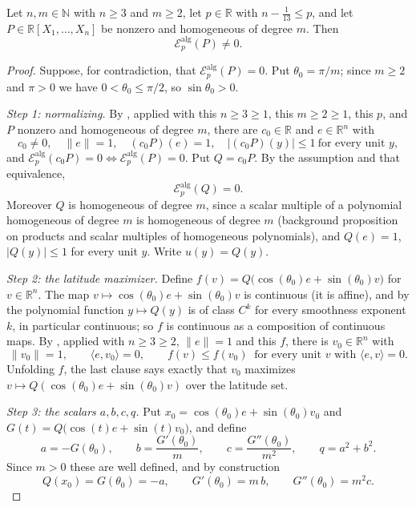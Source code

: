 \begin{theorem}
Let $n,m\in\mathbb{N}$ with $n\ge3$ and $m\ge2$, let $p\in\mathbb{R}$ with
$n-\tfrac1{13}\le p$, and let $P\in\mathbb{R}[X_1,\dots,X_n]$ be nonzero and
homogeneous of degree $m$. Then
\[
  \mathcal{E}^{\mathrm{alg}}_p(P)\ne0 .
\]
\end{theorem}
\begin{proof}
Suppose, for contradiction, that $\mathcal{E}^{\mathrm{alg}}_p(P)=0$. Put
$\theta_0=\pi/m$; since $m\ge2$ and $\pi>0$ we have $0<\theta_0\le\pi/2$, so
$\sin\theta_0>0$.

\emph{Step 1: normalizing.} By , applied with this
$n\ge3\ge1$, this $m\ge2\ge1$, this $p$, and $P$ nonzero and homogeneous of
degree $m$, there are $c_0\in\mathbb{R}$ and $e\in\mathbb{R}^n$ with
\[
  c_0\ne0,\quad\lVert e\rVert=1,\quad(c_0P)(e)=1,\quad
  \lvert(c_0P)(y)\rvert\le1\ \text{for every unit }y,
\]
and $\mathcal{E}^{\mathrm{alg}}_p(c_0P)=0\iff\mathcal{E}^{\mathrm{alg}}_p(P)=0$.
Put $Q=c_0P$. By the assumption and that equivalence,
\begin{equation}\label{eq:hc-Q}
  \mathcal{E}^{\mathrm{alg}}_p(Q)=0 .
\end{equation}
Moreover $Q$ is homogeneous of degree $m$, since a scalar multiple of a
polynomial homogeneous of degree $m$ is homogeneous of degree $m$ (background
proposition on products and scalar multiples of homogeneous polynomials), and
$Q(e)=1$, $\lvert Q(y)\rvert\le1$ for every unit $y$. Write $u(y)=Q(y)$.

\emph{Step 2: the latitude maximizer.} Define
$f(v)=Q\bigl(\cos(\theta_0)e+\sin(\theta_0)v\bigr)$ for $v\in\mathbb{R}^n$. The
map $v\mapsto\cos(\theta_0)e+\sin(\theta_0)v$ is continuous (it is affine), and
by  the polynomial function $y\mapsto Q(y)$ is of class
$C^k$ for every smoothness exponent $k$, in particular continuous; so $f$ is
continuous as a composition of continuous maps. By ,
applied with $n\ge3\ge2$, $\lVert e\rVert=1$ and this $f$, there is
$v_0\in\mathbb{R}^n$ with
\begin{equation}\label{eq:hc-v0}
  \lVert v_0\rVert=1,\qquad\langle e,v_0\rangle=0,\qquad
  f(v)\le f(v_0)\ \text{ for every unit }v\text{ with }\langle e,v\rangle=0 .
\end{equation}
Unfolding $f$, the last clause says exactly that $v_0$ maximizes
$v\mapsto Q(\cos(\theta_0)e+\sin(\theta_0)v)$ over the latitude set.

\emph{Step 3: the scalars $a,b,c,q$.} Put
$x_0=\cos(\theta_0)e+\sin(\theta_0)v_0$ and
$G(t)=Q\bigl(\cos(t)e+\sin(t)v_0\bigr)$, and define
\[
  a=-G(\theta_0),\qquad b=\frac{G'(\theta_0)}{m},\qquad
  c=\frac{G''(\theta_0)}{m^2},\qquad q=a^2+b^2 .
\]
Since $m>0$ these are well defined, and by construction
\begin{equation}\label{eq:hc-defs}
  Q(x_0)=G(\theta_0)=-a,\qquad G'(\theta_0)=m\,b,\qquad G''(\theta_0)=m^2c .
\end{equation}


\end{proof}
